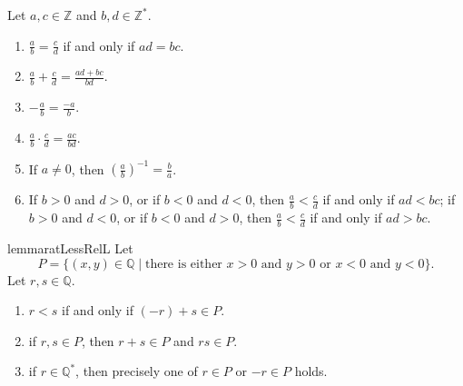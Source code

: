 \begin{lemma} %
	\label{rat:l:alt_def}
	Let $a, c \in \mathbb{Z}$ and $b, d \in \mathbb{Z}^{*}$.
	\begin{enumerate}
		\item \label{rat:l:alt_def:1}
		      $\frac{a}{b} = \frac{c}{d}$ if and only if $a d = b c$.
		\item \label{rat:l:alt_def:2}
		      $\frac{a}{b} + \frac{c}{d} = \frac{a d + b c}{b d}$.
		\item \label{rat:l:alt_def:3}
		      $-\frac{a}{b} = \frac{-a}{b}$.
		\item \label{rat:l:alt_def:4}
		      $\frac{a}{b} \cdot \frac{c}{d} = \frac{a c}{b d}$.
		\item \label{rat:l:alt_def:5}
		      If $a \neq 0$, then $\left( \frac{a}{b} \right)^{-1} = \frac{b}{a}$.
		\item \label{rat:l:alt_def:6}
		      If $b > 0$ and $d > 0$, or if $b < 0$ and $d < 0$, then $\frac{a}{b} < \frac{c}{d}$ if and only if $a d < b c$; if $b > 0$ and $d < 0$, or if $b < 0$ and $d > 0$, then $\frac{a}{b} < \frac{c}{d}$ if and only if $a d > b c$.
	\end{enumerate}
\end{lemma}


\Newpage
\begin{restatable}{lemma}{ratLessRelL} %
	\label{rat:l:less_relation}
	Let
	\[
		P = \{ (x, y) \in \mathbb{Q} \mid \text{there is either $x > 0$ and $y > 0$ or $x < 0$ and $y < 0$} \}.
	\]
	Let $r, s \in \mathbb{Q}$.
	\begin{enumerate}
		\item \label{rat:l:less_relation:1}
		      $r < s$ if and only if $(-r) + s \in P$.
		\item \label{rat:l:less_relation:2}
		      if $r, s \in P$, then $r + s \in P$ and $r s \in P$.
		\item \label{rat:l:less_relation:3}
		      if $r \in \mathbb{Q}^{*}$, then precisely one of $r \in P$ or $-r \in P$ holds.
	\end{enumerate}
\end{restatable}

